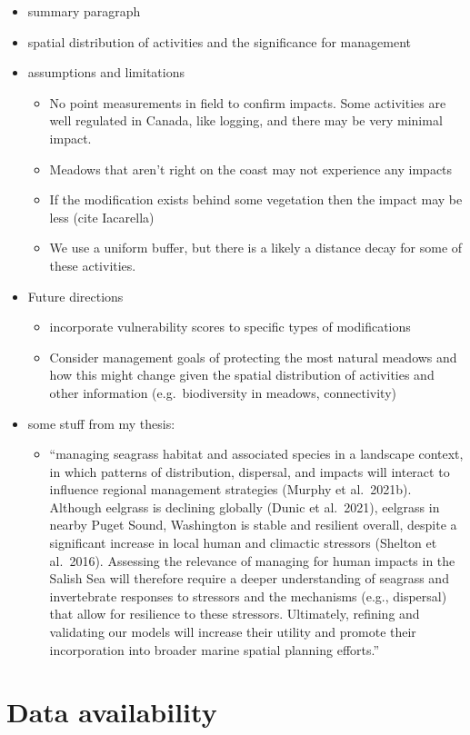 \documentclass[12pt]{article}\usepackage[]{graphicx}\usepackage[]{color}
\begin{document}
\begin{itemize}

\item
  summary paragraph
\item
  spatial distribution of activities and the significance for management
\item
  assumptions and limitations
  \begin{itemize}

  \item
    No point measurements in field to confirm impacts. Some activities are well regulated in Canada, like logging, and there may be very minimal impact.
  \item
    Meadows that aren't right on the coast may not experience any impacts
  \item
    If the modification exists behind some vegetation then the impact may be less (cite Iacarella)
  \item
    We use a uniform buffer, but there is a likely a distance decay for some of these activities.
  \end{itemize}
\item
  Future directions
  \begin{itemize}

  \item
    incorporate vulnerability scores to specific types of modifications
  \item
    Consider management goals of protecting the most natural meadows and how this might change given the spatial distribution of activities and other information (e.g.~biodiversity in meadows, connectivity)
  \end{itemize}
\item
  some stuff from my thesis:
  \begin{itemize}

  \item
    ``managing seagrass habitat and associated species in a landscape context, in which patterns of distribution, dispersal, and impacts will interact to influence regional management strategies (Murphy et al.~2021b). Although eelgrass is declining globally (Dunic et al.~2021), eelgrass in nearby Puget Sound, Washington is stable and resilient overall, despite a significant increase in local human and climactic stressors (Shelton et al.~2016). Assessing the relevance of managing for human impacts in the Salish Sea will therefore require a deeper understanding of seagrass and invertebrate responses to stressors and the mechanisms (e.g., dispersal) that allow for resilience to these stressors. Ultimately, refining and validating our models will increase their utility and promote their incorporation into broader marine spatial planning efforts.''
  \end{itemize}
\end{itemize}
\hypertarget{data-availability}{%
\section{Data availability}\label{data-availability}}
\end{document}
